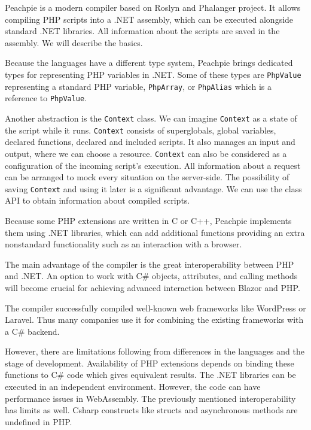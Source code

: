 Peachpie  is a modern compiler based on Roslyn and Phalanger project.
It allows compiling PHP scripts into a .NET assembly, which can be executed alongside standard .NET libraries.
All information about the scripts are saved in the assembly.
We will describe the basics.
\par
Because the languages have a different type system, Peachpie brings dedicated types for representing PHP variables in .NET.
Some of these types are \texttt{PhpValue} representing a standard PHP variable, \texttt{PhpArray}, or \texttt{PhpAlias} which is a reference to \texttt{PhpValue}.
\par
Another abstraction is the \texttt{Context} class.
We can imagine \texttt{Context} as a state of the script while it runs.
\texttt{Context} consists of superglobals, global variables, declared functions, declared and included scripts.
It also manages an input and output, where we can choose a resource.
\texttt{Context} can also be considered as a configuration of the incoming script's execution.
All information about a request can be arranged to mock every situation on the server-side.
The possibility of saving \texttt{Context} and using it later is a significant advantage.
We can use the class API to obtain information about compiled scripts.
\par
Because some PHP extensions are written in C or C++, Peachpie implements them using .NET libraries, which can add additional functions providing an extra nonstandard functionality such as an interaction with a browser.
\par
The main advantage of the compiler is the great interoperability between PHP and .NET.
An option to work with C\# objects, attributes, and calling methods will become crucial for achieving advanced interaction between Blazor and PHP.
\par
The compiler successfully compiled well-known web frameworks like WordPress or Laravel.
Thus many companies use it for combining the existing frameworks with a C\# backend.
\par
However, there are limitations following from differences in the languages and the stage of development.
Availability of PHP extensions depends on binding these functions to C\# code which gives equivalent results. 
The .NET libraries can be executed in an independent environment. 
However, the code can have performance issues in WebAssembly.
The previously mentioned interoperability has limits as well.
Csharp constructs like structs and asynchronous methods are undefined in PHP.
